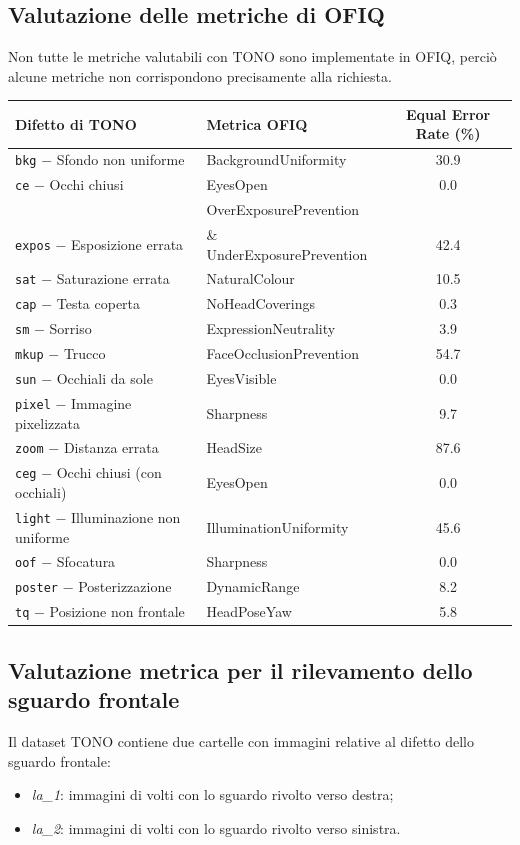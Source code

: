 \documentclass[12pt,a4paper,openright,twoside]{book}
\begin{document}
\subsection{Valutazione delle metriche di OFIQ}
Non tutte le metriche valutabili con TONO sono implementate in OFIQ, perciò alcune metriche non corrispondono precisamente alla richiesta.
\medskip

\begin{tabular}{llc}
\toprule
Difetto di TONO & Metrica OFIQ & Equal Error Rate (\%) \\
\midrule
\texttt{bkg} $-$ Sfondo non uniforme & BackgroundUniformity & 30.9 \\
\texttt{ce} $-$ Occhi chiusi & EyesOpen & 0.0 \\
 & OverExposurePrevention \\ \texttt{expos} $-$ Esposizione errata & \& UnderExposurePrevention & 42.4 \\
\texttt{sat} $-$ Saturazione errata & NaturalColour & 10.5 \\
\texttt{cap} $-$ Testa coperta & NoHeadCoverings & 0.3 \\
\texttt{sm} $-$ Sorriso & ExpressionNeutrality & 3.9 \\
\texttt{mkup} $-$ Trucco & FaceOcclusionPrevention & 54.7 \\
\texttt{sun} $-$ Occhiali da sole & EyesVisible & 0.0 \\
\texttt{pixel} $-$ Immagine pixelizzata & Sharpness & 9.7 \\
\texttt{zoom} $-$ Distanza errata & HeadSize & 87.6 \\
\texttt{ceg} $-$ Occhi chiusi (con occhiali) & EyesOpen & 0.0 \\
\texttt{light} $-$ Illuminazione non uniforme & IlluminationUniformity & 45.6 \\
\texttt{oof} $-$ Sfocatura & Sharpness & 0.0 \\
\texttt{poster} $-$ Posterizzazione & DynamicRange & 8.2 \\
\texttt{tq} $-$ Posizione non frontale & HeadPoseYaw & 5.8 \\
\bottomrule
\end{tabular}

\subsection{Valutazione metrica per il rilevamento dello sguardo frontale}
\label{chap:evalutazione_frontal_gaze_algo}
Il dataset TONO contiene due cartelle con immagini relative al difetto dello sguardo frontale:
\begin{itemize}
    \item \textit{la\_1}: immagini di volti con lo sguardo rivolto verso destra;
    \item \textit{la\_2}: immagini di volti con lo sguardo rivolto verso sinistra.
\end{itemize}
\end{document}
